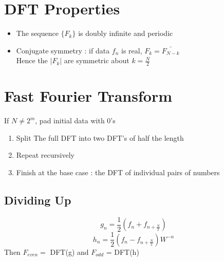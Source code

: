 \documentclass[twoside]{article}
\begin{document}
\section{DFT Properties}
\begin{itemize}
\item The sequence \(\{F_k\}\) is doubly infinite and periodic 
\item Conjugate symmetry : if data \(f_n\) is real, \(F_k = \bar{F_{N-k}}\)\\
Hence the \(|F_k|\) are symmetric about \(k = \frac{N}{2}\)
\end{itemize}

\section{Fast Fourier Transform}
If \(N\neq 2^m \), pad initial data with 0's
\begin{enumerate}
\item Split The full DFT into two DFT's of half the length
\item Repeat recursively
\item Finish at the base case : the DFT of individual pairs of numbers
\end{enumerate}

\subsection{Dividing Up}
$$ g_n = \frac{1}{2} (f_n  + f_{n+\frac{N}{2}})$$
$$ h_n = \frac{1}{2}(f_n - f_{n+\frac{N}{2}}) W^{-n}$$
Then \(F_{even} = \) DFT(g) and \(F_{odd}\) = DFT(h)
\end{document}
